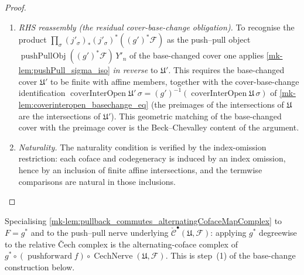 \begin{proof}
\begin{enumerate}
      the canonical adjoint mate.
    \item \emph{RHS reassembly (the residual cover-base-change obligation).} To recognise the
      product \(\prod_\sigma (j'_\sigma)_*(j'_\sigma)^*((g')^*\mathcal{F})\) as the push--pull
      object \(\operatorname{pushPullObj}((g')^*\mathcal{F})\, Y'_n\) of the base-changed cover
      one applies \ref{mk-lem:pushPull_sigma_iso} \emph{in reverse} to \(\mathfrak{U}'\). This
      requires the base-changed cover \(\mathfrak{U}'\) to be finite with affine members,
      together with the cover-base-change identification
      \(\operatorname{coverInterOpen}\mathfrak{U}'\,\sigma = (g')^{-1}
      (\operatorname{coverInterOpen}\mathfrak{U}\,\sigma)\) of
      \ref{mk-lem:coverinteropen_basechange_eq} (the preimages of the intersections
      of \(\mathfrak{U}\) are the intersections of \(\mathfrak{U}'\)). This geometric matching
      of the base-changed cover with the preimage cover is the Beck--Chevalley content of the
      argument.
    \item \emph{Naturality.} The naturality condition is verified by the index-omission
      restriction: each coface and codegeneracy is induced by an index omission, hence by
      an inclusion of finite affine intersections, and the termwise comparisons are natural
      in those inclusions.
  \end{enumerate}
\end{proof}

\begin{definition}\label{mk-def:pullback_cechComplex_alternatingIso}
  \leanok

  Specialising \ref{mk-lem:pullback_commutes_alternatingCofaceMapComplex} to \(F = g^*\)
  and to the push--pull nerve underlying \(\check{\mathcal{C}}^\bullet(\mathfrak{U},
  \mathcal{F})\): applying \(g^*\) degreewise to the relative {\v C}ech complex is the
  alternating-coface complex of \(g^* \circ (\operatorname{pushforward} f) \circ
  \operatorname{CechNerve}(\mathfrak{U}, \mathcal{F})\). This is step~(1) of the
  base-change construction below.
\end{definition}

